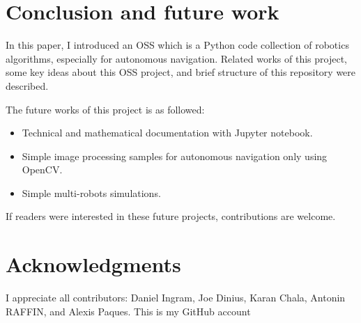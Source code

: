 \documentclass{bmvc2k}
\begin{document}
\section{Conclusion and future work}

In this paper, I introduced an OSS which is a Python code collection of robotics algorithms, especially for autonomous navigation. Related works of this project, some key ideas about this OSS project, and brief structure of this repository were described. 

The future works of this project is as followed: 

\begin{itemize}
 \item Technical and mathematical documentation with Jupyter notebook\cite{JupyterNotebook}.  
 \item Simple image processing samples for autonomous navigation only using OpenCV\cite{opencv}.
 \item Simple multi-robots simulations.
\end{itemize}

If readers were interested in these future projects, contributions are welcome.



\section{Acknowledgments}

I appreciate all contributors: Daniel Ingram\cite{auther1}, Joe Dinius\cite{auther2}, Karan Chala\cite{auther3}, Antonin RAFFIN\cite{auther4}, and Alexis Paques\cite{auther6}. This is my GitHub account\cite{auther5}


\end{document}
